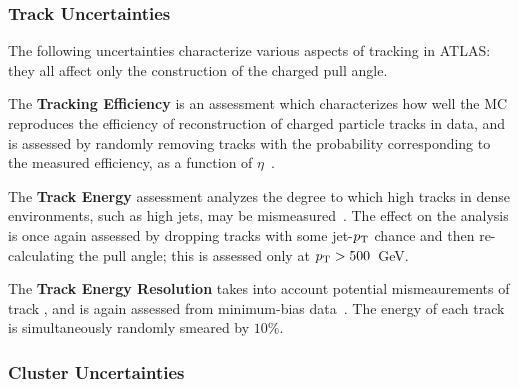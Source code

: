 	\subsubsection{Track Uncertainties}
	\label{chapter:color:uncertainties:tracks}

	The following uncertainties characterize various aspects of tracking in ATLAS: they all affect only the construction of the charged pull angle.

	The \textbf{Tracking Efficiency} is an assessment which characterizes how well the MC reproduces the efficiency of reconstruction of charged particle tracks in data, and is assessed by randomly removing tracks with the probability corresponding to the measured efficiency, as a function of $\eta$~\cite{ATLASCharged}. %


	The \textbf{Track Energy} assessment analyzes the degree to which high \pt tracks in dense environments, such as high \pt jets, may be mismeasured~\cite{trackuncerts}. The effect on the analysis is once again assessed by dropping tracks with some jet-$p_{\text{T}}$ chance and then re-calculating the pull angle; this is assessed only at $p_{\text{T}} > 500$~GeV.%

	The \textbf{Track Energy Resolution} takes into account potential mismeaurements of track \pt, and is again assessed from minimum-bias data~\cite{ATLASCharged}. The energy of each track is simultaneously randomly smeared by $10\%$. 

	\subsubsection{Cluster Uncertainties}
	\label{chapter:color:uncertainties:clusters}

